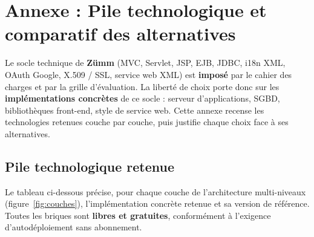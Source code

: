 
\chapter{Annexe : Pile technologique et comparatif des alternatives}
\label{chap:technologies}
Le socle technique de \textbf{Zümm} (MVC, Servlet, JSP, EJB, JDBC, i18n XML,
OAuth Google, X.509 / SSL, service web XML) est \textbf{imposé} par le cahier des
charges et par la grille d'évaluation. La liberté de choix porte donc sur les
\textbf{implémentations concrètes} de ce socle : serveur d'applications, SGBD,
bibliothèques front-end, style de service web. Cette annexe recense les
technologies retenues couche par couche, puis justifie chaque choix face à ses
alternatives.

\section{Pile technologique retenue}
Le tableau ci-dessous précise, pour chaque couche de l'architecture
multi-niveaux (figure~\ref{fig:couches}), l'implémentation concrète retenue et
sa version de référence. Toutes les briques sont \textbf{libres et gratuites},
conformément à l'exigence d'autodéploiement sans abonnement.

